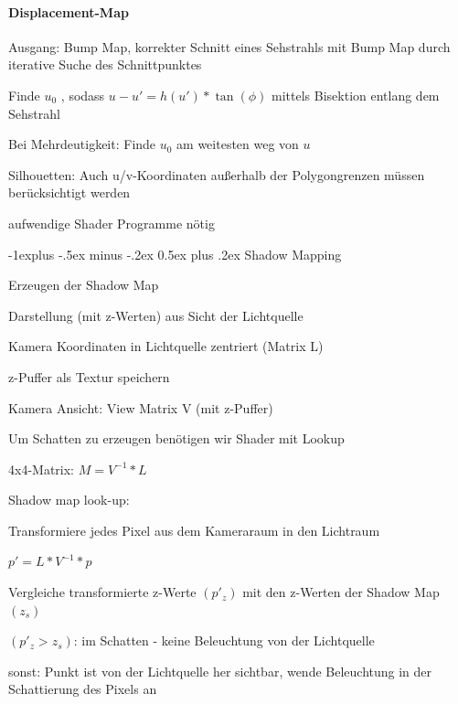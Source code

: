\documentclass[landscape]{article}
\makeatletter
\renewcommand{\subsection}{\@startsection{subsection}{2}{0mm}%
                                {-1explus -.5ex minus -.2ex}%
                                {0.5ex plus .2ex}%
                                {\normalfont\normalsize\bfseries}}
\makeatother
\begin{document}
\begin{multicols}{3}
  \paragraph{Displacement-Map}
  \begin{itemize*}
    \item Ausgang: Bump Map, korrekter Schnitt eines Sehstrahls mit Bump Map durch iterative Suche des Schnittpunktes
    \item Finde $u_0$ , sodass $u-u' = h(u') * \tan(\phi)$ mittels Bisektion entlang dem Sehstrahl
    \item Bei Mehrdeutigkeit: Finde $u_0$ am weitesten weg von $u$
    \item Silhouetten: Auch u/v-Koordinaten außerhalb der Polygongrenzen müssen berücksichtigt werden
    \item aufwendige Shader Programme nötig
  \end{itemize*}
  
  \subsection{Shadow Mapping}
  \begin{itemize*} 
    \item Erzeugen der Shadow Map
    \item Darstellung (mit z-Werten) aus Sicht der Lichtquelle
    \item Kamera Koordinaten in Lichtquelle zentriert (Matrix L)
    \item z-Puffer als Textur speichern
    \item Kamera Ansicht: View Matrix V (mit z-Puffer)
    \item Um Schatten zu erzeugen benötigen wir Shader mit Lookup
    \item 4x4-Matrix: $M = V^{-1}*L$
  \end{itemize*}
  
  Shadow map look-up:
  \begin{itemize*}
    \item Transformiere jedes Pixel aus dem Kameraraum in den Lichtraum
    \item $p'=L*V^{-1}*p$
    \item Vergleiche transformierte z-Werte $(p'_z)$ mit den z-Werten der Shadow Map $(z_s)$
    \item $(p'_z>z_s)$: im Schatten - keine Beleuchtung von der Lichtquelle
    \item sonst: Punkt ist von der Lichtquelle her sichtbar, wende Beleuchtung in der Schattierung des Pixels an
  \end{itemize*}
  

\end{multicols}
\end{document}
